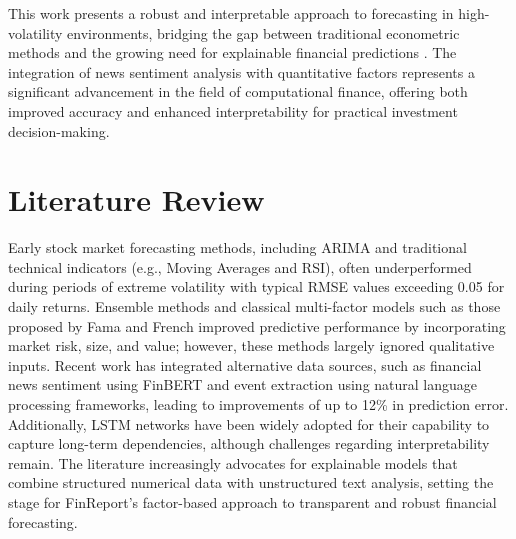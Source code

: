 \documentclass[3p,times,procedia]{elsarticle}
\begin{document}
This work presents a robust and interpretable approach to forecasting in high-volatility environments, bridging the gap between traditional econometric methods and the growing need for explainable financial predictions \cite{TETLOCK2007,Ribeiro2016}. The integration of news sentiment analysis with quantitative factors represents a significant advancement in the field of computational finance, offering both improved accuracy and enhanced interpretability for practical investment decision-making.



\section{Literature Review}

Early stock market forecasting methods, including ARIMA and traditional technical indicators (e.g., Moving Averages and RSI), often underperformed during periods of extreme volatility with typical RMSE values exceeding 0.05 for daily returns. Ensemble methods and classical multi-factor models such as those proposed by Fama and French improved predictive performance by incorporating market risk, size, and value; however, these methods largely ignored qualitative inputs. Recent work has integrated alternative data sources, such as financial news sentiment using FinBERT \cite{Araci2019} and event extraction using natural language processing frameworks, leading to improvements of up to 12\% in prediction error. Additionally, LSTM networks have been widely adopted for their capability to capture long-term dependencies, although challenges regarding interpretability remain. The literature increasingly advocates for explainable models that combine structured numerical data with unstructured text analysis, setting the stage for FinReport’s factor-based approach to transparent and robust financial forecasting.
\end{document}
